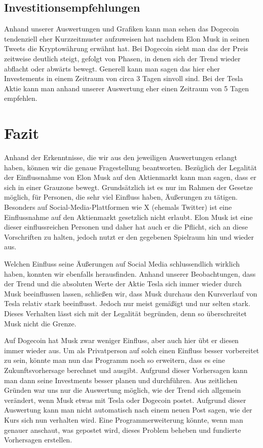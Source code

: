 \documentclass{article}
\begin{document}
\subsection{Investitionsempfehlungen}
Anhand unserer Auswertungen und Grafiken kann man sehen das Dogecoin tendenziell eher Kurzzeitmuster aufzuweisen hat nachdem Elon Musk in seinen Tweets die Kryptowährung erwähnt hat. Bei Dogecoin sieht man das der Preis zeitweise deutlich steigt, gefolgt von Phasen, in denen sich der Trend wieder abflacht oder abwärts bewegt. Generell kann man sagen das hier eher Investements in einem Zeitraum von circa 3 Tagen sinvoll sind. Bei der Tesla Aktie kann man anhand unserer Auswertung eher einen Zeitraum von 5 Tagen empfehlen.


\section{Fazit}
Anhand der Erkenntnisse, die wir aus den jeweiligen Auswertungen erlangt haben, können wir die genaue Fragestellung beantworten. Bezüglich der Legalität der Einflussnahme von Elon Musk auf den Aktienmarkt kann man sagen, dass er sich in einer Grauzone bewegt. Grundsätzlich ist es nur im Rahmen der Gesetze möglich, für Personen, die sehr viel Einfluss haben, Äußerungen zu tätigen. Besonders auf Social-Media-Plattformen wie X (ehemals Twitter) ist eine Einflussnahme auf den Aktienmarkt gesetzlich nicht erlaubt. Elon Musk ist eine dieser einflussreichen Personen und daher hat auch er die Pflicht, sich an diese Vorschriften zu halten, jedoch nutzt er den gegebenen Spielraum hin und wieder aus.

Welchen Einfluss seine Äußerungen auf Social Media schlussendlich wirklich haben, konnten wir ebenfalls herausfinden. Anhand unserer Beobachtungen, dass der Trend und die absoluten Werte der Aktie Tesla sich immer wieder durch Musk beeinflussen lassen, schließen wir, dass Musk durchaus den Kursverlauf von Tesla relativ stark beeinflusst. Jedoch nur meist gemäßigt und nur selten stark. Dieses Verhalten lässt sich mit der Legalität begründen, denn so überschreitet Musk nicht die Grenze.

Auf Dogecoin hat Musk zwar weniger Einfluss, aber auch hier übt er diesen immer wieder aus. Um als Privatperson auf solch einen Einfluss besser vorbereitet zu sein, könnte man nun das Programm noch so erweitern, dass es eine Zukunftsvorhersage berechnet und ausgibt. Aufgrund dieser Vorhersagen kann man dann seine Investments besser planen und durchführen. Aus zeitlichen Gründen war uns nur die Auswertung möglich, wie der Trend sich allgemein verändert, wenn Musk etwas mit Tesla oder Dogecoin postet. Aufgrund dieser Auswertung kann man nicht automatisch nach einem neuen Post sagen, wie der Kurs sich nun verhalten wird. Eine Programmerweiterung könnte, wenn man genauer anschaut, was gepostet wird, dieses Problem beheben und fundierte Vorhersagen erstellen.
\end{document}
